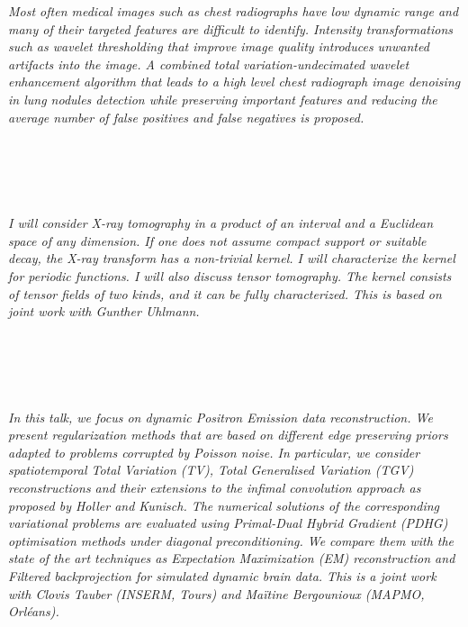   \begin{multicols}{2}
    \textit{Most often medical images such as chest radiographs have low dynamic range and many of their targeted features are difficult to identify. Intensity transformations such as wavelet thresholding that improve image quality introduces unwanted artifacts into the image. A combined total variation-undecimated wavelet enhancement algorithm that leads to a high level chest radiograph image denoising in lung nodules detection while preserving important features and reducing the average number of false positives and false negatives is proposed.}\\
\\ 
      \\
      \\\\
\\
    \textit{I will consider X-ray tomography in a product of an interval and a Euclidean space of any dimension. If one does not assume compact support or suitable decay, the X-ray transform has a non-trivial kernel. I will characterize the kernel for periodic functions. I will also discuss tensor tomography. The kernel consists of tensor fields of two kinds, and it can be fully characterized. This is based on joint work with Gunther Uhlmann.}\\
\\ 
      \\
      \\\\
\\
    \textit{In this talk, we focus on dynamic Positron Emission data reconstruction.  We present regularization methods that are based on different edge preserving priors adapted to problems corrupted by Poisson noise. In particular, we consider spatiotemporal Total Variation (TV), Total Generalised Variation (TGV) reconstructions and their extensions to the infimal convolution approach as proposed by Holler and Kunisch. The numerical solutions of the corresponding variational problems are evaluated using Primal-Dual Hybrid Gradient (PDHG) optimisation methods under diagonal preconditioning. We compare them with the state of the art techniques as Expectation Maximization (EM) reconstruction and Filtered backprojection for simulated dynamic brain data. This is a joint work with Clovis Tauber (INSERM, Tours) and Maïtine Bergounioux (MAPMO, Orléans).}\\

\end{multicols}
